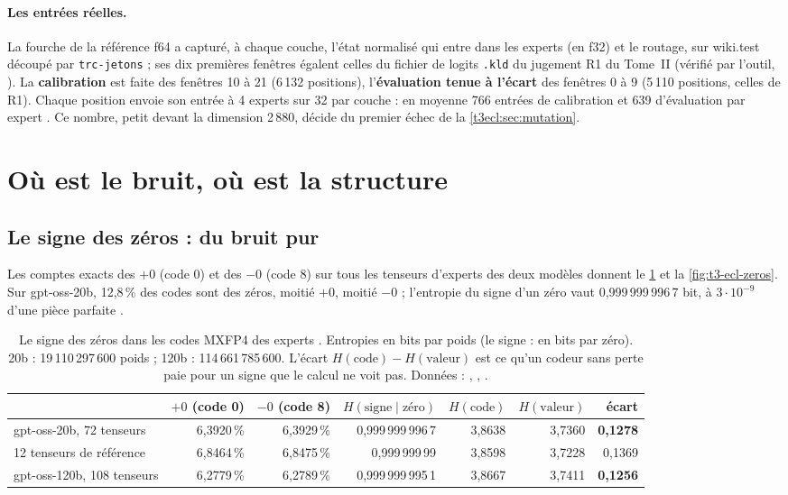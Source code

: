 \paragraph{Les entrées réelles.} La fourche de la référence f64 a capturé, à chaque couche, l'état normalisé qui entre dans les experts (en f32) et le routage, sur wiki.test découpé par \texttt{trc-jetons} ; ses dix premières fenêtres égalent celles du fichier de logits \texttt{.kld} du jugement R1 du Tome~II (vérifié par l'outil, ). La \textbf{calibration} est faite des fenêtres 10 à 21 (6\,132 positions), l'\textbf{évaluation tenue à l'écart} des fenêtres 0 à 9 (5\,110 positions, celles de R1). Chaque position envoie son entrée à 4 experts sur 32 par couche : en moyenne 766 entrées de calibration et 639 d'évaluation par expert \mes. Ce nombre, petit devant la dimension 2\,880, décide du premier échec de la \cref{t3ecl:sec:mutation}.

\section{Où est le bruit, où est la structure}\label{t3ecl:sec:bruit}

\subsection{Le signe des zéros : du bruit pur}

Les comptes exacts des $+0$ (code 0) et des $-0$ (code 8) sur tous les tenseurs d'experts des deux modèles donnent le \cref{t3ecl:tab:zeros} et la \cref{fig:t3-ecl-zeros}. Sur gpt-oss-20b, 12,8\,\% des codes sont des zéros, moitié $+0$, moitié $-0$ ; l'entropie du signe d'un zéro vaut 0,999\,999\,996\,7 bit, à $3\cdot10^{-9}$ d'une pièce parfaite \mes.

\begin{table}[tbp]
\centering\footnotesize\setlength{\tabcolsep}{3pt}
\begin{tabular}{l r r r r r r}
\toprule
& $+0$ (code 0) & $-0$ (code 8) & $H(\text{signe}\mid\text{zéro})$ & $H(\text{code})$ & $H(\text{valeur})$ & écart \\
\midrule
gpt-oss-20b, 72 tenseurs & 6,3920\,\% & 6,3929\,\% & 0,999\,999\,996\,7 & 3,8638 & 3,7360 & \textbf{0,1278} \\
12 tenseurs de référence & 6,8464\,\% & 6,8475\,\% & 0,999\,999\,99 & 3,8598 & 3,7228 & 0,1369 \\
gpt-oss-120b, 108 tenseurs & 6,2779\,\% & 6,2789\,\% & 0,999\,999\,995\,1 & 3,8667 & 3,7411 & \textbf{0,1256} \\
\bottomrule
\end{tabular}
\caption[Le signe des zéros]{Le signe des zéros dans les codes MXFP4 des experts \mes. Entropies en bits par poids (le signe : en bits par zéro). 20b : 19\,110\,297\,600 poids ; 120b : 114\,661\,785\,600. L'écart $H(\text{code}) - H(\text{valeur})$ est ce qu'un codeur sans perte paie pour un signe que le calcul ne voit pas. Données : , , .}
\label{t3ecl:tab:zeros}
\end{table}

